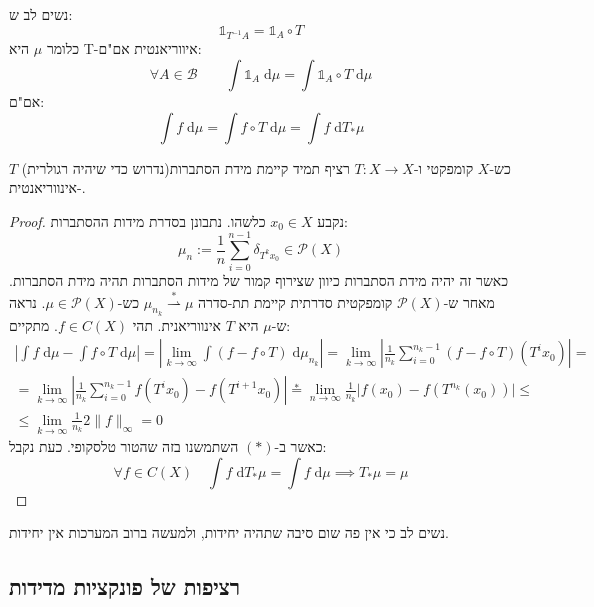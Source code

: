 \documentclass{tstextbook}
\begin{document}
\begin{remark}
נשים לב ש:
$$\mathbb{1} _{T^{-1}A}=\mathbb{1} _{A}\circ  T$$
כלומר \(\mu\) היא T-איווריאנטית אם"ם:
$$\forall A \in \mathcal{B}  \qquad  \int \mathbb{1} _{A} \;\mathrm{d} \mu = \int \mathbb{1}_{A}\circ  T  \;\mathrm{d} \mu  $$
אם"ם:
$$\int f \;\mathrm{d} \mu = \int f \circ  T \;\mathrm{d} \mu = \int  f \;\mathrm{d} T_{*}\mu   $$

\end{remark}
\begin{theorem}
כש-\(X\) קומפקטי ו-\(T:X\to X\) רציף תמיד קיימת מידת הסתברות(נדרוש כדי שיהיה רגולרית) \(T\)-אינווריאנטית.

\end{theorem}
\begin{proof}
נקבע \(x_{0} \in X\) כלשהו. נתבונן בסדרת מידות ההסתברות:
$$\mu_{n}:= \frac{1}{n}\sum_{i=0}^{n-1}\delta_{T^{k}x_{0}}  \in \mathcal{P}(X) $$
כאשר זה יהיה מידת הסתברות כיוון שצירוף קמור של מידות הסתברות תהיה מידת הסתברות.
מאחר ש-\(\mathcal{P}(X)\) קומפקטית סדרתית קיימת תת-סדרה \(\mu_{n_{k}}\overset{*}{\rightharpoonup} \mu\) כש-\(\mu \in \mathcal{P}(X)\). נראה ש-\(\mu\) היא \(T\) אינווריאנית. תהי \(f \in C(X)\). מתקיים:
$$\begin{gather}\left\lvert  \int f \;\mathrm{d} \mu - \int f \circ  T \;\mathrm{d} \mu    \right\rvert = \left\lvert   \lim_{ k \to \infty } \int \left( f-f\circ  T \right) \;\mathrm{d} \mu_{n_{k}}   \right\rvert = \lim_{ k \to \infty } \left\lvert  \frac{1}{n_{k}}\sum_{i=0}^{n_{k}-1}  \left( f-f\circ T \right)(T^{i}x_{0})  \right\rvert = \\=\lim_{ k \to \infty } \left\lvert  \frac{1}{n_{k}}\sum_{i=0}^{n_{k}-1} f(T^{i}x_{0})-f(T^{i+1}x_{0})  \right\rvert \overset{*}{=} \lim_{ n \to \infty } \frac{1}{n_{k}}\lvert f({x_{0}})-f(T^{n_{k}}(x_{0})) \rvert \leq \\
\leq \lim_{ k \to \infty } \frac{1}{n_{k}}2\lVert f \rVert _{\infty}=0 \end{gather} $$
כאשר ב-\((*)\) השתמשנו בזה שהטור טלסקופי. כעת נקבל:
$$\forall f \in C(X)\quad  \int f \;\mathrm{d} T_{*}\mu = \int f \;\mathrm{d} \mu \implies T_{*}\mu = \mu  $$

\end{proof}
\begin{remark}
נשים לב כי אין פה שום סיבה שתהיה יחידות, ולמעשה ברוב המערכות אין יחידות.

\end{remark}
\subsection{רציפות של פונקציות מדידות}
\end{document}
